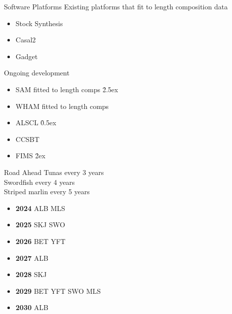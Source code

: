 \documentclass[aspectratio=169]{beamer}
\begin{document}

\begin{frame}{Software Platforms}\small
  Existing platforms that fit to length composition data
  \begin{itemize}
    \item[] Stock Synthesis\\[-1ex]
    \item[] Casal2\\[-1ex]
    \item[] Gadget\\[5ex]
  \end{itemize}
  Ongoing development
  \begin{itemize}
    \item[] SAM fitted to length comps \h{2.5ex}\\[-1ex]
    \item[] WHAM fitted to length comps \\[-1ex]
    \item[] ALSCL \h{0.5ex}\\[-1ex]
    \item[] CCSBT \\[-1ex]
    \item[] FIMS \h{2ex}
  \end{itemize}
\end{frame}


\begin{frame}{Road Ahead}\small
  Tunas every 3 years\\[0.5ex]
  Swordfish every 4 years\\[0.5ex]
  Striped marlin every 5 years\\[2ex]
  \begin{itemize}
    \item[] {\bf 2024} ALB MLS\\[-1ex]
    \item[] {\bf 2025} SKJ SWO\\[-1ex]
    \item[] {\bf 2026} BET YFT\\[-1ex]
    \item[] {\bf 2027} ALB\\[-1ex]
    \item[] {\bf 2028} SKJ\\[-1ex]
    \item[] {\bf 2029} BET YFT SWO MLS\\[-1ex]
    \item[] {\bf 2030} ALB
  \end{itemize}
\end{frame}
\end{document}
